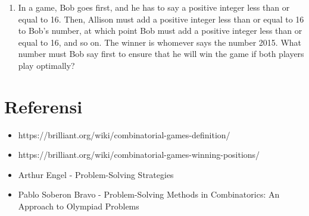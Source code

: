 \documentclass[12pt]{scrartcl}
\begin{document}
\begin{enumerate}
    For example: $ N = 18, D_N = \{ 1,2,3,6,9,18 \} $. Alice chooses $ d=2 $, so she removes $ 1 $ and $ 2 $. The remaining set is $ \{3,6,9,18\} $. Bob chooses $ d = 9 $ and so must also remove $ 3 $. The remaining set is $ \{6,18\} $. Alice takes $ 6 $, and now Bob is forced to take $ 18 $, so he loses.

    Let $ n \ge 2 $ be the largest positive integer $ \le 200 $ such that if Alice and Bob play the divisor game for $ n $ and both of them play optimally, the second player wins. Find $ n $. If no such $ n $ exists, enter $ 999 $.

    \item In a game, Bob goes first, and he has to say a positive integer less than or equal to 16. Then, Allison must add a positive integer less than or equal to 16 to Bob’s number, at which point Bob must add a positive integer less than or equal to 16, and so on. The winner is whomever says the number 2015. What number must Bob say first to ensure that he will win the game if both players play optimally?
\end{enumerate}

\section{Referensi}
\begin{itemize}
    \item https://brilliant.org/wiki/combinatorial-games-definition/
    \item https://brilliant.org/wiki/combinatorial-games-winning-positions/
    \item Arthur Engel - Problem-Solving Strategies
    \item Pablo Soberon Bravo - Problem-Solving Methods in Combinatorics: An Approach to Olympiad Problems
\end{itemize}
\end{document}
